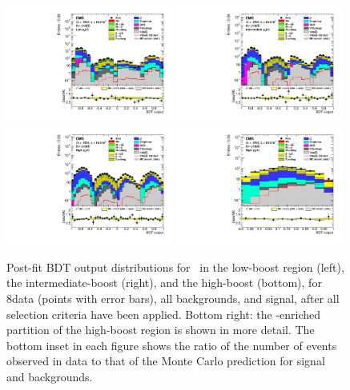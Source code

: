 \documentclass[12pt,twoside,a4paper,cmspaper,final,collab]{cms-tdr}
\begin{document}
\begin{figure}[htbp]
\centering
    \includegraphics[width=0.49\textwidth]{BDT_Znn_LowPt_ZnunuLowPt_8TeV_PostFit_s}
    \includegraphics[width=0.49\textwidth]{BDT_Znn_MedPt_ZnunuMedPt_8TeV_PostFit_s}
    \includegraphics[width=0.49\textwidth]{BDT_Znn_HighPt_ZnunuHighPt_8TeV_PostFit_s}
    \includegraphics[width=0.49\textwidth]{BDT_Znn_HighPt_Last_ZnunuHighPt_8TeV_PostFit_s}
    \caption{Post-fit BDT output distributions for \ZnnH\ in the low-boost region (left),
    the intermediate-boost (right), and the high-boost  (bottom), for 8\TeV data
    (points with error bars), all
    backgrounds, and signal, after all selection criteria have been
    applied.  Bottom right: the \VH-enriched partition of the high-boost region
    is shown in more detail. The bottom inset in each
      figure shows the ratio of the number of events observed in data to that
      of the Monte Carlo prediction for signal and backgrounds.}
    \label{fig:BDTZnn8TeV}
\end{figure}
\end{document}
